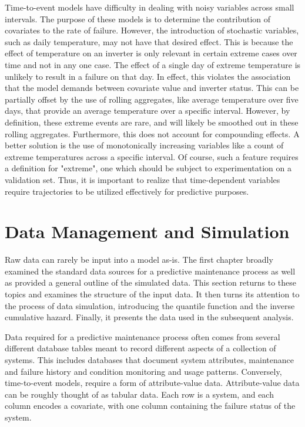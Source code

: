 Time-to-event models have difficulty in dealing with noisy variables across small intervals. The purpose of these models is to determine the contribution of covariates to the rate of failure. However, the introduction of stochastic variables, such as daily temperature, may not have that desired effect. This is because the effect of temperature on an inverter is only relevant in certain extreme cases over time and not in any one case. The effect of a single day of extreme temperature is unlikely to result in a failure on that day. In effect, this violates the association that the model demands between covariate value and inverter status. This can be partially offset by the use of rolling aggregates, like average temperature over five days, that provide an average temperature over a specific interval. However, by definition, these extreme events are rare, and will likely be smoothed out in these rolling aggregates. Furthermore, this does not account for compounding effects. A better solution is the use of monotonically increasing variables like a count of extreme temperatures across a specific interval. Of course, such a feature requires a definition for "extreme", one which should be subject to experimentation on a validation set. Thus, it is important to realize that time-dependent variables require trajectories to be utilized effectively for predictive purposes. 





\section*{Data Management and Simulation}

Raw data can rarely be input into a model as-is. The first chapter broadly examined the standard data sources for a predictive maintenance process as well as provided a general outline of the simulated data. This section returns to these topics and examines the structure of the input data. It then turns its attention to the process of data simulation, introducing the quantile function and the inverse cumulative hazard. Finally, it presents the data used in the subsequent analysis.


Data required for a predictive maintenance process often comes from several different database tables meant to record different aspects of a collection of systems. This includes databases that document system attributes, maintenance and failure history and condition monitoring and usage patterns. Conversely, time-to-event models, require a form of attribute-value data. Attribute-value data can be roughly thought of as tabular data. Each row is a system, and each column encodes a covariate, with one column containing the failure status of the system. 

